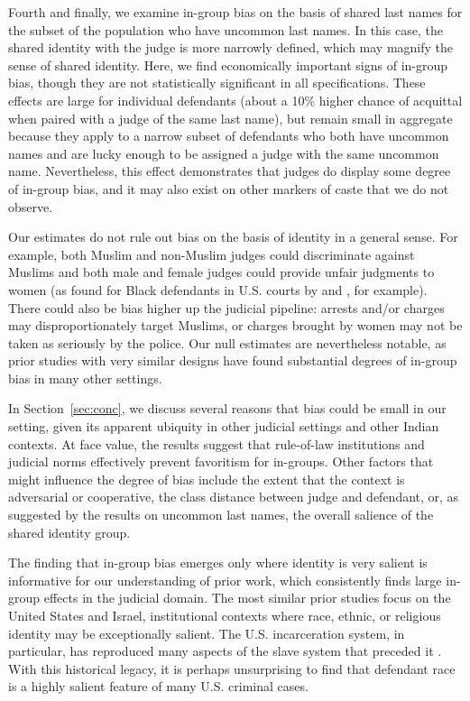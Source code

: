 \documentclass[12pt,english]{article}
\begin{document}
Fourth and finally, we examine in-group bias on the basis of shared last names for the subset of the population who have uncommon last names. In this case, the shared identity with the judge is more narrowly defined, which may magnify the sense of shared identity. Here, we find economically important signs of in-group bias, though they are not statistically significant in all specifications. These effects are large for individual defendants (about a 10\% higher chance of acquittal when paired with a judge of the same last name), but remain small in aggregate because they apply to a narrow subset of defendants who both have uncommon names and are lucky enough to be assigned a judge with the same uncommon name. Nevertheless, this effect demonstrates that judges do display some degree of in-group bias, and it may also exist on other markers of caste that we do not observe.

Our estimates do not rule out bias on the basis of identity in a general sense. For example, both Muslim and non-Muslim judges could discriminate against Muslims and both male and female judges could provide unfair judgments to women (as found for Black defendants in U.S. courts by \citet{arnold2018racial} and \citet{arnold2022measuring}, for example). There could also be bias higher up the judicial pipeline: arrests and/or charges may disproportionately target Muslims, or charges brought by women may not be taken as seriously by the police. Our null estimates are nevertheless notable, as prior studies with very similar designs have found substantial degrees of in-group bias in many other settings.

In Section~\ref{sec:conc}, we discuss several reasons that bias could be small in our  setting, given its apparent ubiquity in other judicial settings and other Indian contexts. At face value, the results suggest that rule-of-law institutions and judicial norms effectively prevent favoritism for in-groups. Other factors that might influence the degree of bias include the extent that the context is adversarial or cooperative, the class distance between judge and defendant, or, as suggested by the results on uncommon last names, the overall salience of the shared identity group. 

The finding that in-group bias emerges only where identity is very salient is informative for our understanding of prior work, which consistently finds large in-group effects in the judicial domain. The most similar prior studies focus on the United States and Israel, institutional contexts where race, ethnic, or religious identity may be exceptionally salient. The U.S. incarceration system, in particular, has reproduced many aspects of the slave system that preceded it \citep{Alexander2010Jim}. With this historical legacy, it is perhaps unsurprising to find that defendant race is a highly salient feature of many U.S. criminal cases.
\end{document}
